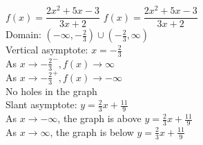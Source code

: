 {$f(x) = \dfrac{2x^{2} + 5x - 3}{3x + 2}$}
{$f(x) = \dfrac{2x^{2} + 5x - 3}{3x + 2}$\\
Domain: $\left(-\infty, -\frac{2}{3}\right) \cup \left(-\frac{2}{3}, \infty\right)$\\
Vertical asymptote: $x = -\frac{2}{3}$\\
As $x \rightarrow -\frac{2}{3}^{-}, f(x) \rightarrow \infty$\\
As $x \rightarrow -\frac{2}{3}^{+}, f(x) \rightarrow -\infty$\\
No holes in the graph \\
Slant asymptote:  $y = \frac{2}{3}x + \frac{11}{9}$ \\
As $x \rightarrow  -\infty$, the graph is above  $y = \frac{2}{3}x + \frac{11}{9}$\\
As $x \rightarrow \infty$, the graph is below $y = \frac{2}{3}x + \frac{11}{9}$ }
